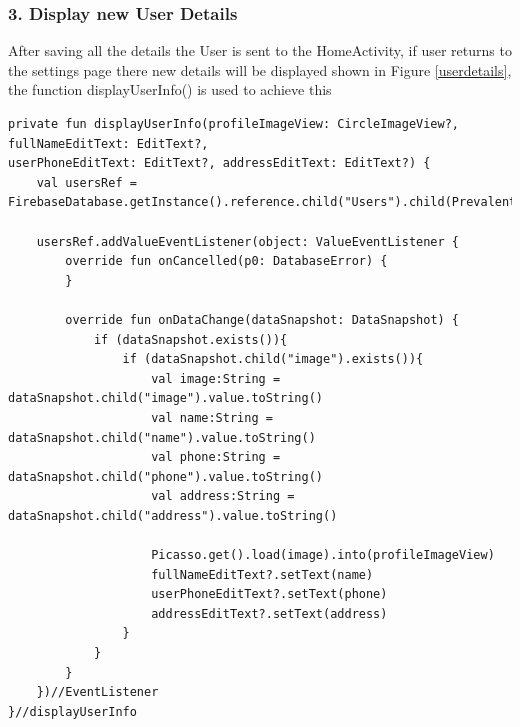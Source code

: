 \subsubsection{3. Display new User Details}
After saving all the details the User is sent to the HomeActivity, if user returns to the settings page there new details will be displayed shown in Figure \ref{userdetails}, the function displayUserInfo() is used to achieve this

\begin{verbatim}
private fun displayUserInfo(profileImageView: CircleImageView?, fullNameEditText: EditText?,
userPhoneEditText: EditText?, addressEditText: EditText?) {
    val usersRef = FirebaseDatabase.getInstance().reference.child("Users").child(Prevalent.currentOnlineUser.getPhone())

    usersRef.addValueEventListener(object: ValueEventListener {
        override fun onCancelled(p0: DatabaseError) {
        }

        override fun onDataChange(dataSnapshot: DataSnapshot) {
            if (dataSnapshot.exists()){
                if (dataSnapshot.child("image").exists()){
                    val image:String = dataSnapshot.child("image").value.toString()
                    val name:String = dataSnapshot.child("name").value.toString()
                    val phone:String = dataSnapshot.child("phone").value.toString()
                    val address:String = dataSnapshot.child("address").value.toString()

                    Picasso.get().load(image).into(profileImageView)
                    fullNameEditText?.setText(name)
                    userPhoneEditText?.setText(phone)
                    addressEditText?.setText(address)
                }
            }
        }
    })//EventListener
}//displayUserInfo
\end{verbatim}